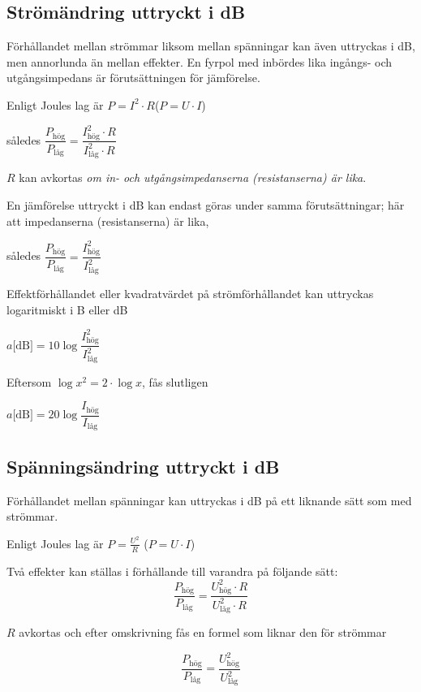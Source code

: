 \subsection{Strömändring uttryckt i dB}

Förhållandet mellan strömmar liksom mellan spänningar kan även uttryckas i dB,
men annorlunda än mellan effekter.
En fyrpol med inbördes lika ingångs- och utgångsimpedans är förutsättningen för
jämförelse.

Enligt Joules lag är \(P = I^2 \cdot R\)\qquad (\(P = U \cdot I\))

således \(\dfrac{P_\text{hög}}{P_\text{l{\aa}g}} = 
\dfrac{I_\text{hög}^2 \cdot R}{I_\text{låg}^2 \cdot R}\)

$R$ kan avkortas \emph{om in- och utgångsimpedanserna (resistanserna) är lika}.

En jämförelse uttryckt i dB kan endast göras under samma förutsättningar;
här att impedanserna (resistanserna) är lika,

således \(\dfrac{P_\text{hög}}{P_\text{låg}} = \dfrac{I_\text{hög}^2}{I_\text{låg}^2}\)

Effektförhållandet eller kvadratvärdet på strömförhållandet kan uttryckas
logaritmiskt i B eller dB

\(a\text{[dB]} = 10\log \dfrac{I_\text{hög}^2}{I_\text{låg}^2}\)

Eftersom \(\log x^2 = 2 \cdot \log x\), fås slutligen

\(a\text{[dB]} = 20\log \dfrac{I_\text{hög}}{I_\text{låg}}\)

\subsection{Spänningsändring uttryckt i dB}

Förhållandet mellan spänningar kan uttryckas i dB på ett liknande sätt som med
strömmar.

Enligt Joules lag är \(P = \frac{U^2}{R}\) (\(P = U \cdot I\))

Två effekter kan ställas i förhållande till varandra på följande sätt:
\begin{equation*}
\frac{P_\text{hög}}{P_\text{låg}}=
\frac{U_\text{hög}^2 \cdot R}{U_\text{låg}^2 \cdot R}
\end{equation*}

\(R\) avkortas och efter omskrivning fås en formel som liknar den för strömmar

\begin{equation*}
	\dfrac{P_\text{hög}}{P_\text{låg}} = \dfrac{U_\text{hög}^2}{U_\text{låg}^2}
\end{equation*}

